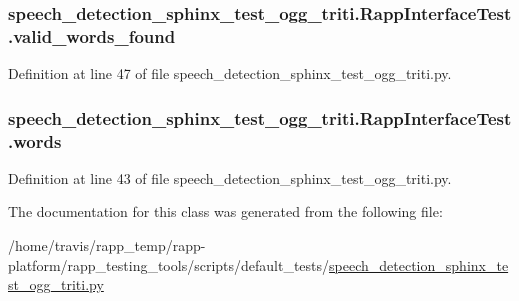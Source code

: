 \hypertarget{classspeech__detection__sphinx__test__ogg__triti_1_1RappInterfaceTest_ae3fe6a3bbd709b9c314aad0ab8368d2f}{
\subsubsection[{valid\-\_\-words\-\_\-found}]{\setlength{\rightskip}{0pt plus 5cm}speech\-\_\-detection\-\_\-sphinx\-\_\-test\-\_\-ogg\-\_\-triti.\-Rapp\-Interface\-Test.\-valid\-\_\-words\-\_\-found}}\label{classspeech__detection__sphinx__test__ogg__triti_1_1RappInterfaceTest_ae3fe6a3bbd709b9c314aad0ab8368d2f}


Definition at line 47 of file speech\-\_\-detection\-\_\-sphinx\-\_\-test\-\_\-ogg\-\_\-triti.\-py.

\hypertarget{classspeech__detection__sphinx__test__ogg__triti_1_1RappInterfaceTest_adb592a75b793940b89a3c6ac1bf79ebe}{
\subsubsection[{words}]{\setlength{\rightskip}{0pt plus 5cm}speech\-\_\-detection\-\_\-sphinx\-\_\-test\-\_\-ogg\-\_\-triti.\-Rapp\-Interface\-Test.\-words}}\label{classspeech__detection__sphinx__test__ogg__triti_1_1RappInterfaceTest_adb592a75b793940b89a3c6ac1bf79ebe}


Definition at line 43 of file speech\-\_\-detection\-\_\-sphinx\-\_\-test\-\_\-ogg\-\_\-triti.\-py.



The documentation for this class was generated from the following file\-:\begin{DoxyCompactItemize}
\item 
/home/travis/rapp\-\_\-temp/rapp-\/platform/rapp\-\_\-testing\-\_\-tools/scripts/default\-\_\-tests/\hyperlink{speech__detection__sphinx__test__ogg__triti_8py}{speech\-\_\-detection\-\_\-sphinx\-\_\-test\-\_\-ogg\-\_\-triti.\-py}\end{DoxyCompactItemize}

